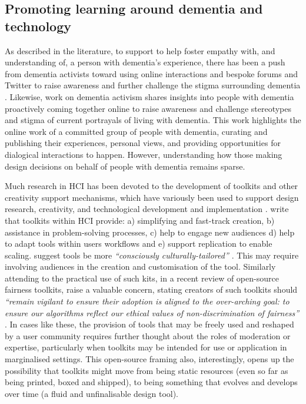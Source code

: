 \subsection{Promoting learning around dementia and technology}
\label{BL:gap:Learning}
As described in the literature, to support to help foster empathy with, and understanding of, a person with dementia's experience, there has been a push from dementia activists toward using online interactions and bespoke forums and Twitter to raise awareness and further challenge the stigma surrounding dementia \citep{talbot_how_2020}. Likewise, \cite{lazar_safe_2019} work on dementia activism shares insights into people with dementia proactively coming together online to raise awareness and challenge stereotypes and stigma of current portrayals of living with dementia. This work highlights the online work of a committed group of people with dementia, curating and publishing their experiences, personal views, and providing opportunities for dialogical interactions to happen. However, understanding how those making design decisions on behalf of people with dementia remains sparse. 

Much research in HCI has been devoted to the development of toolkits and other creativity support mechanisms, which have variously been used to support design research, creativity, and technological development and implementation \citep{broderick2020theory}. \cite{ledo2018evaluation} write that toolkits within HCI provide: a) simplifying and fast-track creation, b) assistance in problem-solving processes, c) help to engage new audiences d) help to adapt tools within users workflows and e) support replication to enable scaling. \cite{peters2020toolkits} suggest tools be more \textit{``consciously culturally-tailored'' \citep[pg.20]{peters2020toolkits}}. This may require involving audiences in the creation and customisation of the tool. Similarly attending to the practical use of such kits, in a recent review of open-source fairness toolkits, \cite{lee2021landscape} raise a valuable concern, stating creators of such toolkits should \textit{``remain vigilant to ensure their adoption is aligned to the over-arching goal: to ensure our algorithms reflect our ethical values of non-discrimination of fairness'' \citep[pg.12]{lee2021landscape}}. In cases like these, the provision of tools that may be freely used and reshaped by a user community requires further thought about the roles of moderation or expertise, particularly when toolkits may be intended for use or application in marginalised settings. This open-source framing also, interestingly, opens up the possibility that toolkits might move from being static resources (even so far as being printed, boxed and shipped), to being something that evolves and develops over time (a fluid and unfinalisable design tool).

